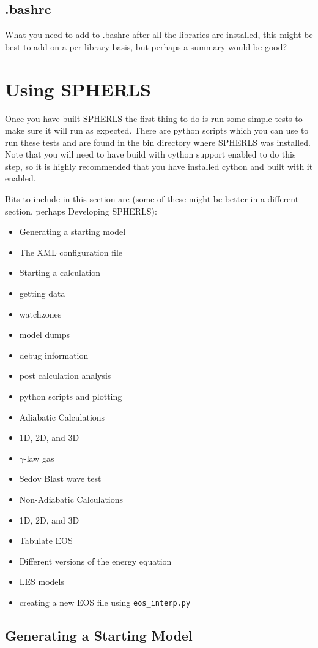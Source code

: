 \documentclass[12pt,a4paper]{book}
\begin{document}
\section{.bashrc}
What you need to add to .bashrc after all the libraries are installed, this might be best to add on a per library basis, but perhaps a summary would be good?

\chapter{Using SPHERLS}
Once you have built SPHERLS the first thing to do is run some simple tests to make sure it will run as expected. There are python scripts which you can use to run these tests and are found in the bin directory where SPHERLS was installed. Note that you will need to have build with cython support enabled to do this step, so it is highly recommended that you have installed cython and built with it enabled.


Bits to include in this section are (some of these might be better in a different section, perhaps Developing SPHERLS):
\begin{itemize}
\item Generating a starting model
\item The XML configuration file
\item Starting a calculation
\item getting data
\item watchzones
\item model dumps
\item debug information
\item post calculation analysis
\item python scripts and plotting
\item Adiabatic Calculations
\item 1D, 2D, and 3D
\item $\gamma$-law gas
\item Sedov Blast wave test
\item Non-Adiabatic Calculations
\item 1D, 2D, and 3D
\item Tabulate EOS
\item Different versions of the energy equation
\item LES models
\item creating a new EOS file using {\tt eos\_interp.py}
\end{itemize}

\section{Generating a Starting Model}
\end{document}
